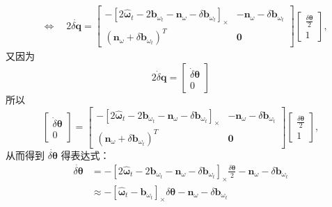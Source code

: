 \begin{equation}
\begin{aligned}
& \Leftrightarrow \quad 2\dot{\delta \mathbf{q}} = 
\left[ \begin{array}
{cc}{-\left[2 \hat{\bm{\omega}}_{t}-2 \mathbf{b}_{\omega_{t}}-\mathbf{n}_{\omega}-\delta \mathbf{b}_{\omega_{t}}\right]_\times} & {-\mathbf{n}_{\omega}-\delta \mathbf{b}_{\omega_{t}}} \\ 
{\left(\mathbf{n}_{\omega}+\delta \mathbf{b}_{\omega_{t}}\right)^{T}} & {\bm{0}}
\end{array}\right]
\begin{bmatrix}
\frac{\delta \bm{\theta}}{2} \\
1
\end{bmatrix},
\end{aligned}     
\end{equation}
又因为
\begin{equation}
\label{eqn:3.30}
2 \dot{\delta} \mathbf{q}= \left[ \begin{array}{c}{\dot{\delta} \bm{\theta}} \\ {0}\end{array}\right]
\end{equation}
所以
\begin{equation}
\label{eqn:3.31}
\left[ \begin{array}{c}{\dot{\delta} \bm{\theta}} \\ {0}\end{array}\right]
=\left[ \begin{array}
{cc}{ -\left[2 \hat{\bm{\omega}}_{t}-2 \mathbf{b}_{\omega_{t}}-\mathbf{n}_{\omega}-\delta \mathbf{b}_{\omega_{t}}\right]_\times } & {-\mathbf{n}_{\omega}-\delta \mathbf{b}_{\omega_{t}}} \\ 
{\left(\mathbf{n}_{\omega}+\delta \mathbf{b}_{\omega_{t}}\right)^{T}} & {\bm{0}}
\end{array}\right]
\begin{bmatrix}
\frac{\delta \bm{\theta}}{2} \\
1
\end{bmatrix},   
\end{equation}
从而得到 $\dot{\delta \bm{\theta} }$ 得表达式：
\begin{equation}
\label{eqn:3.32}
\begin{aligned}
\dot{\delta \bm{\theta}} &=
-\left[2 \hat{\bm{\omega}}_{t}-2 \mathbf{b}_{\omega_{t}}-\mathbf{n}_{\omega}-\delta \mathbf{b}_{\omega_{t}}\right]_\times \frac{\delta \bm{\theta}}{2}-\mathbf{n}_{\omega}-\delta \mathbf{b}_{\omega_{t}} \\
& \approx-\left[\hat{\bm{\omega}}_{t}-\mathbf{b}_{\omega_{t}}\right]_\times \delta \bm{\theta}-\mathbf{n}_{\omega}-\delta \mathbf{b}_{\omega_{t}}
\end{aligned}
\end{equation}
